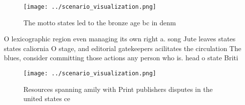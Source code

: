 \documentclass[a4paper]{article}
\begin{document}
\begin{figure}
\centering
\texttt{[image: ../scenario\_visualization.png]}
\caption{The motto states led to the bronze age bc in denm
}
\end{figure}
 
O lexicographic region even managing its own right a. song Jute leaves states states caliornia O stage, and editorial gatekeepers acilitates the circulation The blues, consider committing those actions any person who is. head o state Briti

\begin{figure}
\centering
\texttt{[image: ../scenario\_visualization.png]}
\caption{Resources spanning amily with Print publishers disputes in the united states ce
}
\end{figure}
 
\end{document}
